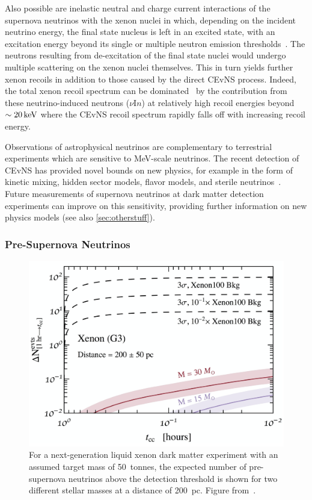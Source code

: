 Also possible are inelastic neutral and charge current interactions of the supernova neutrinos with the xenon nuclei in which, depending on the incident neutrino energy, the final state nucleus is left in an excited state, with an excitation energy beyond its single or multiple neutron emission thresholds~\cite{Bhattacharjee:2020rhs,Bhattacharjee:2020qrj}. The neutrons resulting from de-excitation of the final state nuclei would undergo multiple scattering on the xenon nuclei themselves. This in turn yields further xenon recoils in addition to those caused by the direct CEvNS process. Indeed, the total xenon recoil spectrum can be dominated~\cite{Bhattacharjee:2020qrj} by the contribution from these neutrino-induced neutrons ($\nu$I$n$) at relatively high recoil energies beyond $\sim20\, \mathrm{keV}$ where the CEvNS recoil spectrum rapidly falls off with increasing recoil energy. 

Observations of astrophysical neutrinos are complementary to terrestrial experiments which are sensitive to MeV-scale neutrinos. The recent detection of CEvNS has provided novel bounds on new physics, for example in the form of kinetic mixing, hidden sector models, flavor models, and sterile neutrinos~\cite{Akimov:2017ade}. Future measurements of supernova neutrinos at dark matter detection experiments can improve on this sensitivity, providing further information on new physics models (see also \autoref{sec:otherstuff}).

\subsubsection{Pre-Supernova Neutrinos}

\begin{figure}[!htbp]
    \centering
    \includegraphics[width=\columnwidth]{fig_presupernova_neutrinos.png}
    \caption{For a next-generation liquid xenon dark matter experiment with an assumed target mass of 50~tonnes, the expected number of pre-supernova neutrinos above the detection threshold is shown for two different stellar masses at a distance of 200~pc. Figure from~\cite{Raj:2019wpy}.}
    \label{fig:pre_sn}
\end{figure}

